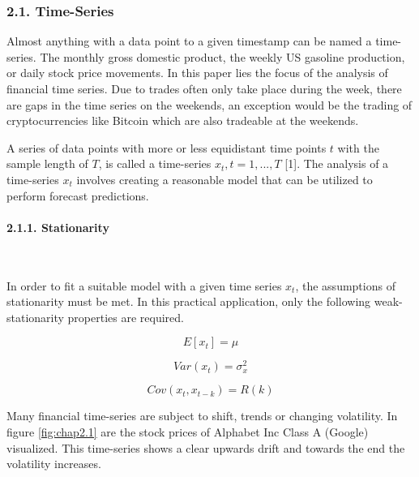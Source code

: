 \documentclass[
]{article}
\begin{document}
\hypertarget{time-series}{%
\subsubsection{2.1. Time-Series}\label{time-series}}

Almost anything with a data point to a given timestamp can be named a
time-series. The monthly gross domestic product, the weekly US gasoline
production, or daily stock price movements. In this paper lies the focus
of the analysis of financial time series. Due to trades often only take
place during the week, there are gaps in the time series on the
weekends, an exception would be the trading of cryptocurrencies like
Bitcoin which are also tradeable at the weekends.

A series of data points with more or less equidistant time points \(t\)
with the sample length of \(T\), is called a time-series
\(x_{t}, t=1,...,T\) {[}1{]}. The analysis of a time-series \(x_{t}\)
involves creating a reasonable model that can be utilized to perform
forecast predictions.

\hypertarget{stationarity}{%
\paragraph{2.1.1. Stationarity}\label{stationarity}}

~

In order to fit a suitable model with a given time series \(x_{t}\), the
assumptions of stationarity must be met. In this practical application,
only the following weak-stationarity properties are required.

\begin{equation}
  \label{eq:mean}
  E[x_{t}]=\mu
\end{equation}

\begin{equation}
  \label{eq:var}
  Var(x_{t})=\sigma_{x}^{2}
\end{equation}

\begin{equation}
  \label{eq:cov}
  Cov(x_{t}, x_{t-k})=R(k)
\end{equation}

Many financial time-series are subject to shift, trends or changing
volatility. In figure \ref{fig:chap2.1} are the stock prices of Alphabet
Inc Class A (Google) visualized. This time-series shows a clear upwards
drift and towards the end the volatility increases.
\end{document}
